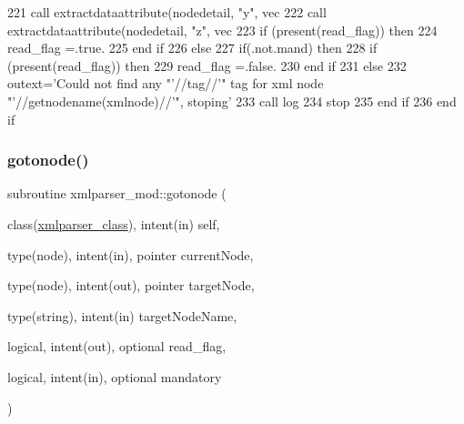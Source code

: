 \begin{DoxyCode}
221         \textcolor{keyword}{call }extractdataattribute(nodedetail, \textcolor{stringliteral}{"y"}, vec%
222         \textcolor{keyword}{call }extractdataattribute(nodedetail, \textcolor{stringliteral}{"z"}, vec%
223         \textcolor{keywordflow}{if} (\textcolor{keyword}{present}(read\_flag)) \textcolor{keywordflow}{then}
224             read\_flag =.true.
225 \textcolor{keywordflow}{        end if}
226     \textcolor{keywordflow}{else}
227         \textcolor{keywordflow}{if}(.not.mand) \textcolor{keywordflow}{then}
228             \textcolor{keywordflow}{if} (\textcolor{keyword}{present}(read\_flag)) \textcolor{keywordflow}{then}
229                 read\_flag =.false.
230 \textcolor{keywordflow}{            end if}
231         \textcolor{keywordflow}{else}
232             outext=\textcolor{stringliteral}{'Could not find any "'}//tag//\textcolor{stringliteral}{'" tag for xml node "'}//getnodename(xmlnode)//\textcolor{stringliteral}{'", stoping'}
233             \textcolor{keyword}{call }log%
234             stop
235 \textcolor{keywordflow}{        end if}
236 \textcolor{keywordflow}{    end if}
\end{DoxyCode}
\mbox{\label{namespacexmlparser__mod_acd860c3d06a25fc422edbcc3d356d976}} 
\subsubsection{\texorpdfstring{gotonode()}{gotonode()}}
{\footnotesize\ttfamily subroutine xmlparser\+\_\+mod\+::gotonode (\begin{DoxyParamCaption}\item[{class(\mbox{\hyperlink{structxmlparser__mod_1_1xmlparser__class}{xmlparser\+\_\+class}}), intent(in)}]{self,  }\item[{type(node), intent(in), pointer}]{current\+Node,  }\item[{type(node), intent(out), pointer}]{target\+Node,  }\item[{type(string), intent(in)}]{target\+Node\+Name,  }\item[{logical, intent(out), optional}]{read\+\_\+flag,  }\item[{logical, intent(in), optional}]{mandatory }\end{DoxyParamCaption})\hspace{0.3cm}{\ttfamily [private]}}



